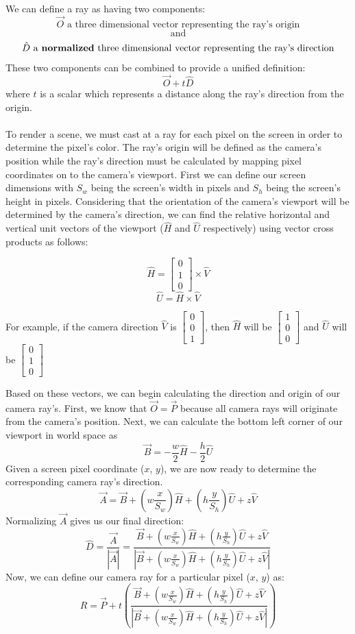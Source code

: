 We can define a ray as having two components:
$$\Vec{O} \text{ a three dimensional vector representing the ray's origin}$$
$$\text{and}$$
$$\hat{D} \text{ a \textbf{normalized} three dimensional vector representing the ray's direction}$$
These two components can be combined to provide a unified definition:
$$ \Vec{O} + t\hat{D} $$
where $t$ is a scalar which represents a distance along the ray's direction from the origin. \\ \\
\noindent
To render a scene, we must cast at a ray for each pixel on the screen in order to determine the pixel's color. The ray's origin will be defined as the camera's position while the ray's direction must be calculated by mapping pixel coordinates on to the camera's viewport. First we can define our screen dimensions with $S_w$ being the screen's width in pixels and $S_h$ being the screen's height in pixels. Considering that the orientation of the camera's viewport will be determined by the camera's direction, we can find the relative horizontal and vertical unit vectors of the viewport ($\hat{H}$ and $\hat{U}$ respectively) using vector cross products as follows:

$$\hat{H} = \begin{bmatrix} 0 \\ 1 \\ 0 \end{bmatrix} \times \hat{V}  $$
$$\hat{U} = \hat{H} \times \hat{V}$$

\noindent
For example, if the camera direction $\hat{V}$ is $\begin{bmatrix} 0 \\ 0 \\ 1 \end{bmatrix}$, then $\hat{H}$ will be $\begin{bmatrix} 1 \\ 0 \\ 0 \end{bmatrix}$ and $\hat{U}$ will be $\begin{bmatrix} 0 \\ 1 \\ 0 \end{bmatrix}$

\noindent
Based on these vectors, we can begin calculating the direction and origin of our camera ray's. First, we know that $\Vec{O} = \Vec{P}$ because all camera rays will originate from the camera's position. Next, we can calculate the bottom left corner of our viewport in world space as
$$\Vec{B} = -\frac{w}{2}\hat{H} - \frac{h}{2}\hat{U}$$
Given a screen pixel coordinate ($x$, $y$), we are now ready to determine the corresponding camera ray's direction.
$$\Vec{A} = \Vec{B} + (w \frac{x}{S_w})\hat{H} + (h \frac{y}{S_h})\hat{U} + z\hat{V}$$
Normalizing $\Vec{A}$ gives us our final direction:
$$\hat{D} = \frac{\Vec{A}}{|\Vec{A}|} = \frac{\Vec{B} + (w \frac{x}{S_w})\hat{H} + (h \frac{y}{S_h})\hat{U} + z\hat{V}}{|\Vec{B} + (w \frac{x}{S_w})\hat{H} + (h \frac{y}{S_h})\hat{U} + z\hat{V}|}$$
Now, we can define our camera ray for a particular pixel ($x$, $y$) as:
$$R = \Vec{P} + t(\frac{\Vec{B} + (w \frac{x}{S_w})\hat{H} + (h \frac{y}{S_h})\hat{U} + z\hat{V}}{|\Vec{B} + (w \frac{x}{S_w})\hat{H} + (h \frac{y}{S_h})\hat{U} + z\hat{V}|})$$

